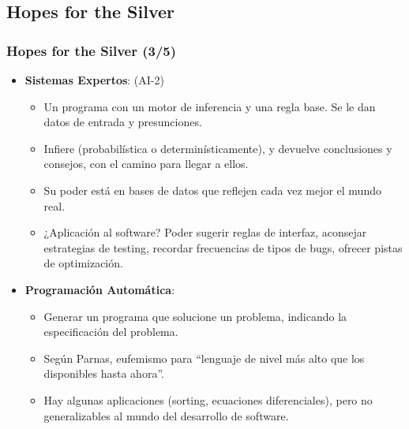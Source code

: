 \documentclass{beamer}
\begin{document}
\subsection*{Hopes for the Silver}
\begin{frame}
  \frametitle{Hopes for the Silver (3/5)}
  \begin{itemize}
    \item \textbf{Sistemas Expertos}: (AI-2)		
      \begin{itemize}
	\item Un programa con un motor de inferencia y una regla base. Se le dan datos de entrada y presunciones.
	\item Infiere (probabilística o determinísticamente), y devuelve conclusiones y consejos, con el camino para llegar a ellos.
	\item Su poder está en bases de datos que reflejen cada vez mejor el mundo real.
	\item ¿Aplicación al software? Poder sugerir reglas de interfaz, aconsejar estrategias de testing, recordar frecuencias de tipos de bugs, ofrecer pistas de optimización.
      \end{itemize}
    \item \textbf{Programación Automática}:
      \begin{itemize}
	\item Generar un programa que solucione un problema, indicando la especificación del problema.
	\item Según Parnas, eufemismo para ``lenguaje de nivel más alto que los disponibles hasta ahora''.
	\item Hay algunas aplicaciones (sorting, ecuaciones diferenciales), pero no generalizables al mundo del desarrollo de software.
      \end{itemize}
  \end{itemize}
\end{frame}
\end{document}
